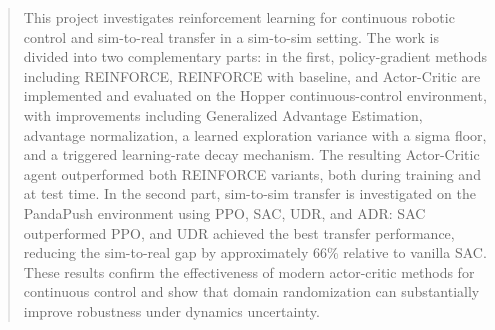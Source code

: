 \begin{abstract}
This project investigates reinforcement learning for continuous robotic 
control and sim-to-real transfer in a sim-to-sim setting. The work is 
divided into two complementary parts: in the first, policy-gradient methods 
including REINFORCE, REINFORCE with baseline, and Actor-Critic are implemented 
and evaluated on the Hopper continuous-control environment, with improvements 
including Generalized Advantage Estimation, advantage normalization, a learned 
exploration variance with a sigma floor, and a triggered learning-rate decay 
mechanism. The resulting Actor-Critic agent outperformed both
REINFORCE variants, both during training and at test time. In the
second part, sim-to-sim transfer is investigated on the PandaPush environment 
using PPO, SAC, UDR, and ADR: SAC outperformed PPO, and UDR achieved the best 
transfer performance, reducing the sim-to-real gap by approximately 66\% 
relative to vanilla SAC. These results confirm the effectiveness of modern 
actor-critic methods for continuous control and show that domain randomization 
can substantially improve robustness under dynamics uncertainty.
\end{abstract}
